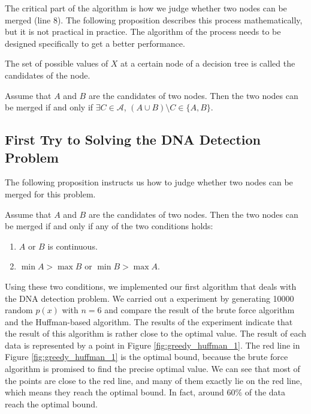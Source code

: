 The critical part of the algorithm is how we judge whether two nodes can be merged (line 8). The following proposition describes this process mathematically, but it is not practical in practice. The algorithm of the process needs to be designed specifically to get a better performance.

\begin{definition}
The set of possible values of $X$ at a certain node of a decision tree is called the candidates of the node.
\end{definition}

\begin{proposition}
Assume that $A$ and $B$ are the candidates of two nodes. Then the two nodes can be merged if and only if $\exists C \in \mathscr{A}$, $(A \cup B)\setminus C \in \{A, B\}$.
\end{proposition}

\subsection{First Try to Solving the DNA Detection Problem}

The following proposition instructs us how to judge whether two nodes can be merged for this problem.

\begin{proposition}
Assume that $A$ and $B$ are the candidates of two nodes. Then the two nodes can be merged if and only if any of the two conditions holds:
    \begin{enumerate}[label=(\arabic*)]
        \item $A$ or $B$ is continuous.
        \item $\min A > \max B$ or $\min B > \max A$.
    \end{enumerate}
\end{proposition}

Using these two conditions, we implemented our first algorithm that deals with the DNA detection problem. We carried out a experiment by generating \num{10000} random $p(x)$ with $n=6$ and compare the result of the brute force algorithm and the Huffman-based algorithm. The results of the experiment indicate that the result of this algorithm is rather close to the optimal value. The result of each data is represented by a point in Figure \ref{fig:greedy_huffman_1}. The red line in Figure \ref{fig:greedy_huffman_1} is the optimal bound, because the brute force algorithm is promised to find the precise optimal value. We can see that most of the points are close to the red line, and many of them exactly lie on the red line, which means they reach the optimal bound. In fact, around $60\%$ of the data reach the optimal bound.

